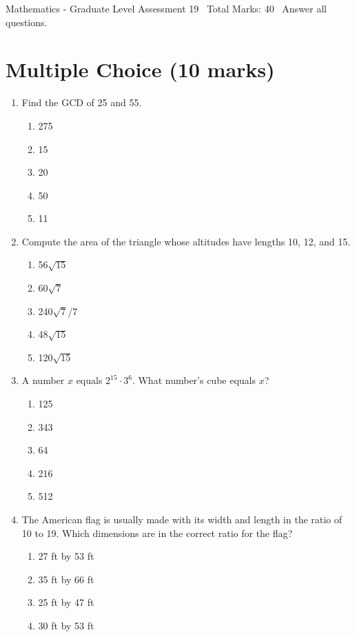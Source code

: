 \documentclass[12pt]{article}
\begin{document}
\begin{center}
Mathematics - Graduate Level Assessment 19 \
Total Marks: 40 \
Answer all questions.
\end{center}

\section*{Multiple Choice (10 marks)}
\begin{enumerate}[label=\arabic*.]
\item Find the GCD of 25 and 55.
\begin{enumerate}[label=(\alph*)]
    \item 275
    \item 15
    \item 20
    \item 50
    \item 11
\end{enumerate}
\item Compute the area of the triangle whose altitudes have lengths 10, 12, and 15.
\begin{enumerate}[label=(\alph*)]
    \item 56\ensuremath{\sqrt{15}}
    \item 60\ensuremath{\sqrt{7}}
    \item 240\ensuremath{\sqrt{7}}/7
    \item 48\ensuremath{\sqrt{15}}
    \item 120\ensuremath{\sqrt{15}}
\end{enumerate}
\item A number $x$ equals $2^{15}\cdot 3^6$. What number's cube equals $x$?
\begin{enumerate}[label=(\alph*)]
    \item 125
    \item 343
    \item 64
    \item 216
    \item 512
\end{enumerate}
\item The American flag is usually made with its width and length in the ratio of 10 to 19. Which dimensions are in the correct ratio for the flag?
\begin{enumerate}[label=(\alph*)]
    \item 27 ft by 53 ft
    \item 35 ft by 66 ft
    \item 25 ft by 47 ft
    \item 30 ft by 53 ft

\end{enumerate}
\end{enumerate}
\end{document}

